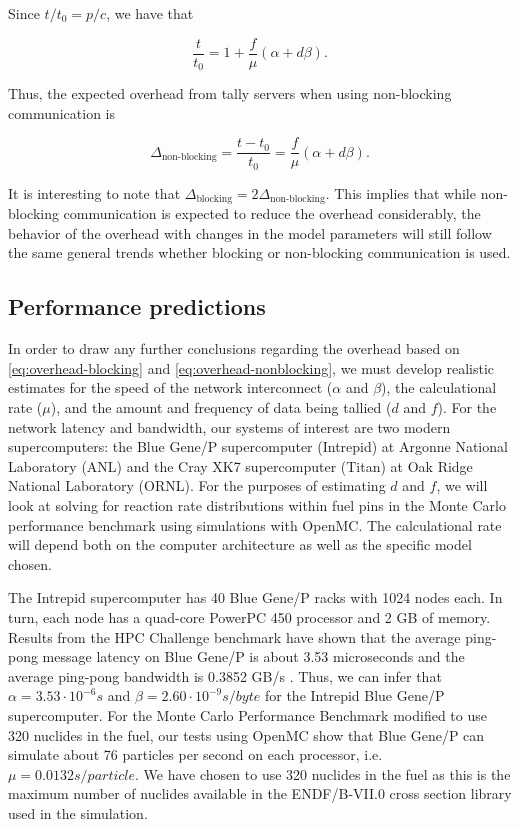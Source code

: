 \noindent Since $t/t_0 = p/c$, we have that

\begin{equation}
  \label{eq:model-nonblocking}
  \frac{t}{t_0} = 1 + \frac{f}{\mu} \left ( \alpha + d\beta
    \right ).
\end{equation}

\noindent Thus, the expected overhead from tally servers when using non-blocking
communication is

\begin{equation}
  \label{eq:overhead-nonblocking}
  \Delta_{\text{non-blocking}} = \frac{t - t_0}{t_0} = \frac{f}{\mu} \left (
  \alpha + d\beta \right ).
\end{equation}

\noindent It is interesting to note that $\Delta_{\text{blocking}} =
2\Delta_{\text{non-blocking}}$. This implies that while non-blocking
communication is expected to reduce the overhead considerably, the behavior of
the overhead with changes in the model parameters will still follow the same
general trends whether blocking or non-blocking communication is used.

\subsection{Performance predictions}

In order to draw any further conclusions regarding the overhead based on
\eqref{eq:overhead-blocking} and \eqref{eq:overhead-nonblocking}, we must
develop realistic estimates for the speed of the network interconnect ($\alpha$
and $\beta$), the calculational rate ($\mu$), and the amount and frequency of
data being tallied ($d$ and $f$). For the network latency and bandwidth, our
systems of interest are two modern supercomputers: the Blue Gene/P supercomputer
(Intrepid) at Argonne National Laboratory (ANL) and the Cray XK7 supercomputer
(Titan) at Oak Ridge National Laboratory (ORNL). For the purposes of estimating
$d$ and $f$, we will look at solving for reaction rate distributions within fuel
pins in the Monte Carlo performance benchmark \cite{mc-hoogenboom-2011} using
simulations with OpenMC. The calculational rate will depend both on the computer
architecture as well as the specific model chosen.

The Intrepid supercomputer has 40 Blue Gene/P racks with 1024 nodes each. In
turn, each node has a quad-core PowerPC 450 processor and 2 GB of
memory. Results from the HPC Challenge benchmark have shown that the average
ping-pong message latency on Blue Gene/P is about 3.53 microseconds and the
average ping-pong bandwidth is 0.3852 GB/s \cite{sc-alam-2008}. Thus, we can
infer that $\alpha = 3.53 \cdot 10^{-6} \unit{s}$ and $\beta = 2.60 \cdot
10^{-9} \unit{s/byte}$ for the Intrepid Blue Gene/P supercomputer. For the Monte
Carlo Performance Benchmark modified to use 320 nuclides in the fuel, our tests
using OpenMC show that Blue Gene/P can simulate about 76 particles per second on
each processor, i.e. $\mu = 0.0132 \unit{s/particle}$. We have chosen to use 320
nuclides in the fuel as this is the maximum number of nuclides available in the
ENDF/B-VII.0 cross section library used in the simulation.

